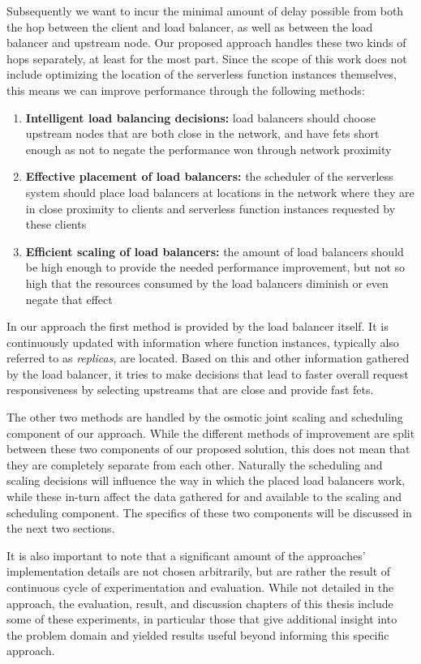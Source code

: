 Subsequently we want to incur the minimal amount of delay possible from both the hop between the client and load balancer, as well as between the load balancer and upstream node. Our proposed approach handles these two kinds of hops separately, at least for the most part. Since the scope of this work does not include optimizing the location of the serverless function instances themselves, this means we can improve performance through the following methods:
\begin{enumerate}
    \item \textbf{Intelligent load balancing decisions:} load balancers should choose upstream nodes that are both close in the network, and have \glspl{fet} short enough as not to negate the performance won through network proximity
    \item \textbf{Effective placement of load balancers:} the scheduler of the serverless system should place load balancers at locations in the network where they are in close proximity to clients and serverless function instances requested by these clients
    \item \textbf{Efficient scaling of load balancers:} the amount of load balancers should be high enough to provide the needed performance improvement, but not so high that the resources consumed by the load balancers diminish or even negate that effect
\end{enumerate}
In our approach the first method is provided by the load balancer itself. It is continuously updated with information where function instances, typically also referred to as \textit{replicas}, are located. Based on this and other information gathered by the load balancer, it tries to make decisions that lead to faster overall request responsiveness by selecting upstreams that are close and provide fast \glspl{fet}.

The other two methods are handled by the osmotic joint scaling and scheduling component of our approach. While the different methods of improvement are split between these two components of our proposed solution, this does not mean that they are completely separate from each other. Naturally the scheduling and scaling decisions will influence the way in which the placed load balancers work, while these in-turn affect the data gathered for and available to the scaling and scheduling component. The specifics of these two components will be discussed in the next two sections. 

It is also important to note that a significant amount of the approaches' implementation details are not chosen arbitrarily, but are rather the result of continuous cycle of experimentation and evaluation. While not detailed in the approach, the evaluation, result, and discussion chapters of this thesis include some of these experiments, in particular those that give additional insight into the problem domain and yielded results useful beyond informing this specific approach.
